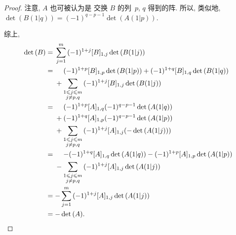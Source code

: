 \documentclass[../libro.tex]{subfiles}
\begin{document}
\begin{proof}
    注意, \(A\) 也可被认为是%
    交换 \(B\) 的列~\(p\), \(q\) 得到的阵.
    所以, 类似地,
    \(\det {(B(1|q))} = (-1)^{q-p-1} \det {(A(1|p))}\).

    综上,
    \begin{align*}
        \det {(B)}
        = {} &
        \sum_{j = 1}^{m}
        {(-1)^{1 + j} [B]_{1,j} \det {(B(1|j))}}
        \\
        = {} &
        \hphantom{{} + {}}
        (-1)^{1 + p} [B]_{1,p} \det {(B(1|p))}
        + (-1)^{1 + q} [B]_{1,q} \det {(B(1|q))}
        \\
        & +
        \sum_{\substack{1 \leq j \leq m \\ j \neq p, q}}
        {(-1)^{1 + j} [B]_{1,j} \det {(B(1|j))}}
        \\
        = {} &
        \hphantom{{} + {}}
        (-1)^{1 + p} [A]_{1,q} (-1)^{q-p-1} \det {(A(1|q))}
        \\
        & +
        (-1)^{1 + q} [A]_{1,p} (-1)^{q-p-1} \det {(A(1|p))}
        \\
        & +
        \sum_{\substack{1 \leq j \leq m \\ j \neq p, q}}
        {(-1)^{1 + j} [A]_{1,j} (-\det {(A(1|j))})}
        \\
        = {} &
        \hphantom{{} + {}}
        {-} (-1)^{1 + q} [A]_{1,q} \det {(A(1|q))}
        - (-1)^{1 + p} [A]_{1,p} \det {(A(1|p))}
        \\
        & -
        \sum_{\substack{1 \leq j \leq m \\ j \neq p, q}}
        {(-1)^{1 + j} [A]_{1,j} \det {(A(1|j))}}
        \\
        = {} &
        {-} \sum_{j = 1}^{m}
        {(-1)^{1 + j} [A]_{1,j} \det {(A(1|j))}}
        \\
        = {} &
        {-} \det {(A)}.
    \end{align*}




\end{proof}
\end{document}

